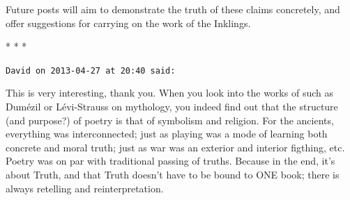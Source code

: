 Future posts will aim to demonstrate the truth of these claims concretely, and offer suggestions for carrying on the work of the Inklings.



\begin{center}* * *\end{center}

\begin{footnotesize}
\begin{sffamily}
\texttt{David on 2013-04-27 at 20:40 said:}

This is very interesting, thank you. When you look into the works of such as Dumézil or Lévi-Strauss on mythology, you indeed find out that the structure (and purpose?) of poetry is that of symbolism and religion. For the ancients, everything was interconnected; just as playing was a mode of learning both concrete and moral truth; just as war was an exterior and interior figthing, etc. Poetry was on par with traditional passing of truths. Because in the end, it's about Truth, and that Truth doesn't have to be bound to ONE book; there is always retelling and reinterpretation.

\end{sffamily}
\end{footnotesize}

